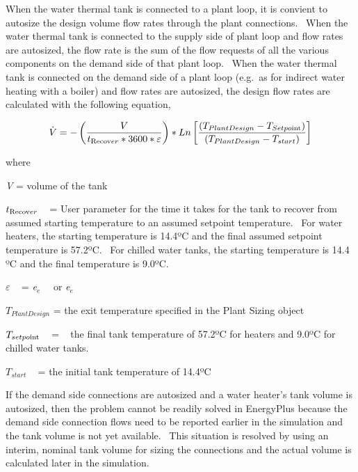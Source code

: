 When the water thermal tank is connected to a plant loop, it is convient to autosize the design volume flow rates through the plant connections.~ When the water thermal tank is connected to the supply side of plant loop and flow rates are autosized, the flow rate is the sum of the flow requests of all the various components on the demand side of that plant loop.~ When the water thermal tank is connected on the demand side of a plant loop (e.g.~as for indirect water heating with a boiler) and flow rates are autosized, the design flow rates are calculated with the following equation,

\begin{equation}
\dot V =  - \left( {\frac{V}{{{t_{{\mathop{\rm Re}\nolimits} {\mathop{\rm cov}} er}} * 3600 * \varepsilon }}} \right) * Ln\left[ {\frac{{\left( {{T_{PlantDesign}} - {T_{Setpo{\mathop{\rm int}} }}} \right)}}{{\left( {{T_{PlantDesign}} - {T_{start}}} \right)}}} \right]
\end{equation}

where

\emph{V} = volume of the tank

\({t_{{\mathop{\rm Re}\nolimits} {\mathop{\rm cov}} er}}\) ~ = User parameter for the time it takes for the tank to recover from assumed starting temperature to an assumed setpoint temperature.~ For water heaters, the starting temperature is 14.4ºC and the final assumed setpoint temperature is 57.2ºC.~ For chilled water tanks, the starting temperature is 14.4 ºC and the final temperature is 9.0ºC.

\(\varepsilon\) ~ = \emph{e\(_{e}\)} ~~or \emph{e\(_{e}\)}

\({T_{PlantDesign}}\) = the exit temperature specified in the Plant Sizing object

\({T_{setpo{\mathop{\rm int}} }}\) ~ = ~ the final tank temperature of 57.2ºC for heaters and 9.0ºC for chilled water tanks.

\({T_{start}}\) ~ = the initial tank temperature of 14.4ºC

If the demand side connections are autosized and a water heater's tank volume is autosized, then the problem cannot be readily solved in EnergyPlus because the demand side connection flows need to be reported earlier in the simulation and the tank volume is not yet available.~ This situation is resolved by using an interim, nominal tank volume for sizing the connections and the actual volume is calculated later in the simulation.

